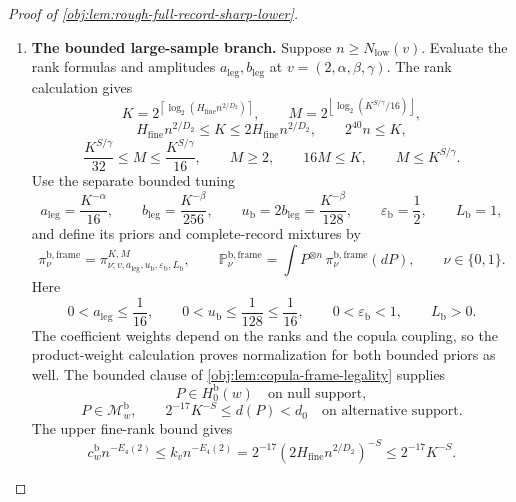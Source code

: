 \documentclass[11pt]{article}
\begin{document}
\begin{proof}[Proof of \cref{obj:lem:rough-full-record-sharp-lower}]
\begin{enumerate}
\item \textbf{The bounded large-sample branch.}
Suppose \(n\ge N_{\mathrm{low}}(v)\). Evaluate the rank formulas and amplitudes \(a_{\mathrm{leg}},b_{\mathrm{leg}}\) at \(v=(2,\alpha,\beta,\gamma)\). The rank calculation gives
\[
K=
2^{\left\lceil\log_2(H_{\mathrm{fine}}n^{2/D_2})\right\rceil},
\qquad
M=
2^{\left\lfloor\log_2(K^{S/\gamma}/16)\right\rfloor},
\]
\[
H_{\mathrm{fine}}n^{2/D_2}\le K
\le2H_{\mathrm{fine}}n^{2/D_2},
\qquad
2^{40}n\le K,
\]
\[
\frac{K^{S/\gamma}}{32}\le M
\le\frac{K^{S/\gamma}}{16},
\qquad
M\ge2,\qquad16M\le K,\qquad M\le K^{S/\gamma}.
\]
Use the separate bounded tuning
\[
a_{\mathrm{leg}}=\frac{K^{-\alpha}}{16},
\qquad
b_{\mathrm{leg}}=\frac{K^{-\beta}}{256},
\qquad
u_{\mathrm b}=2b_{\mathrm{leg}}=\frac{K^{-\beta}}{128},
\qquad
\varepsilon_{\mathrm b}=\frac12,
\qquad
L_{\mathrm b}=1,
\]
and define its priors and complete-record mixtures by
\[
\pi_\nu^{\mathrm{b,frame}}
=
\pi^{K,M}_{\nu;v,a_{\mathrm{leg}},u_{\mathrm b},\varepsilon_{\mathrm b},L_{\mathrm b}},
\qquad
\mathbb P_\nu^{\mathrm{b,frame}}
=
\int P^{\otimes n}\,\pi_\nu^{\mathrm{b,frame}}(dP),
\qquad \nu\in\{0,1\}.
\]
Here
\[
0<a_{\mathrm{leg}}\le\frac1{16},
\qquad
0<u_{\mathrm b}\le\frac1{128}\le\frac1{16},
\qquad
0<\varepsilon_{\mathrm b}<1,
\qquad L_{\mathrm b}>0.
\]
The coefficient weights depend on the ranks and the copula coupling, so the product-weight calculation proves normalization for both bounded priors as well. The bounded clause of
\cref{obj:lem:copula-frame-legality} supplies
\[
P\in H_0^{\mathrm b}(w)
\quad\text{on null support},
\]
\[
P\in\mathcal M_w^{\mathrm b},
\qquad
2^{-17}K^{-S}\le d(P)<d_0
\quad\text{on alternative support}.
\]
The upper fine-rank bound gives
\[
c_w^{\mathrm b}n^{-E_4(2)}
\le k_vn^{-E_4(2)}
=
2^{-17}(2H_{\mathrm{fine}}n^{2/D_2})^{-S}
\le2^{-17}K^{-S}.
\]


\end{enumerate}
\end{proof}
\end{document}
